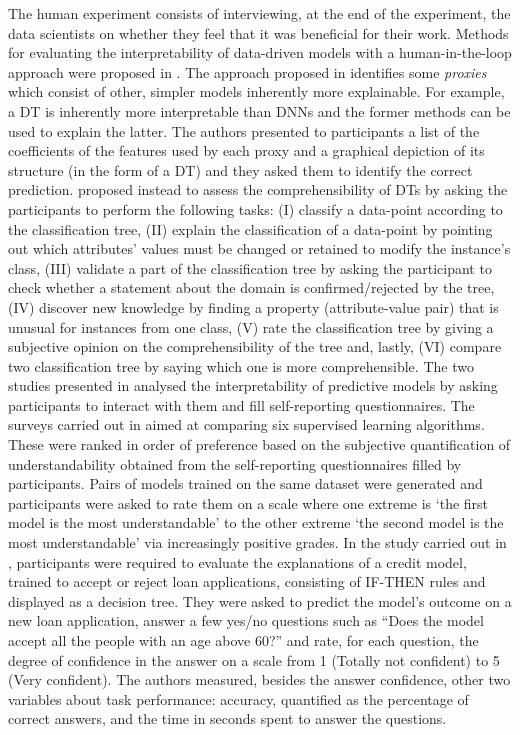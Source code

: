 \documentclass[final,1p,times]{elsarticle}
\begin{document}
The human experiment consists of interviewing, at the end of the experiment, the data scientists on whether they feel that it was beneficial for their work.
Methods for evaluating the interpretability of data-driven models with a human-in-the-loop approach were proposed in \cite{lage2018human, allahyari2011user, huysmans2011empirical, luvstrek2014comprehensibility}. The approach proposed in \cite{lage2018human} identifies some \textit{proxies} which consist of other, simpler models inherently more explainable. For example, a DT is inherently more interpretable than DNNs and the former methods can be used to explain the latter. The authors presented to participants a list of the coefficients of the features used by each proxy and a graphical depiction of its structure (in the form of a DT) and they asked them to identify the correct prediction. 
\cite{luvstrek2014comprehensibility} proposed instead to assess the comprehensibility of DTs by asking the participants to perform the following tasks: (I) classify a data-point according to the classification tree, (II) explain the classification of a data-point by pointing out which attributes’ values must be changed or retained to modify the instance's class, (III) validate a part of the classification tree by asking the participant to check whether a statement about the domain is confirmed/rejected by the tree, (IV) discover new knowledge by finding a property (attribute-value pair) that is unusual for instances from one class, (V) rate the classification tree by giving a subjective opinion on the comprehensibility of the tree and, lastly, (VI) compare two classification tree by saying which one is more comprehensible. 
The two studies presented in \cite{allahyari2011user, huysmans2011empirical} analysed the interpretability of predictive models by asking participants to interact with them and fill self-reporting questionnaires. The surveys carried out in \cite{allahyari2011user} aimed at comparing six supervised learning algorithms. These were ranked in order of preference based on the subjective quantification of understandability obtained from the self-reporting questionnaires filled by participants. Pairs of models trained on the same dataset were generated and participants were asked to rate them on a scale where one extreme is `the first model is the most understandable' to the other extreme `the second model is the most understandable' via increasingly positive grades. In the study carried out in \cite{huysmans2011empirical}, participants were required to evaluate the explanations of a credit model, trained to accept or reject loan applications, consisting of IF-THEN rules and displayed as a decision tree. They were asked to predict the model's outcome on a new loan application, answer a few yes/no questions such as ``Does the model accept all the people with an age above 60?'' and rate, for each question, the degree of confidence in the answer on a scale from 1 (Totally not confident) to 5 (Very confident). The authors measured, besides the answer confidence, other two variables about task performance: accuracy, quantified as the percentage of correct answers, and the time in seconds spent to answer the questions.
\end{document}
